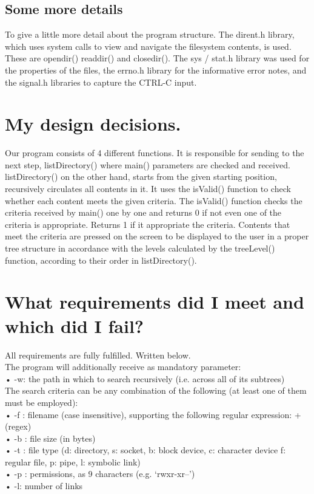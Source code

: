 \documentclass{article}
\begin{document}
\subsection{Some more details}
\quad To give a little more detail about the program structure. The dirent.h library, which uses system calls to view and navigate the filesystem contents, is used. These are opendir() readdir() and closedir(). The sys / stat.h library was used for the properties of the files, the errno.h library for the informative error notes, and the signal.h libraries to capture the CTRL-C input.\\

\section{My design decisions.}
 \quad Our program consists of 4 different functions. It is responsible for sending to the next step, listDirectory() where main() parameters are checked and received. listDirectory() on the other hand, starts from the given starting position, recursively circulates all contents in it. It uses the isValid() function to check whether each content meets the given criteria. The isValid() function checks the criteria received by main() one by one and returns 0 if not even one of the criteria is appropriate. Returns 1 if it appropriate the criteria. Contents that meet the criteria are pressed on the screen to be displayed to the user in a proper tree structure in accordance with the levels calculated by the treeLevel() function, according to their order in listDirectory().\\

\section{What requirements did I meet and which did I fail?}
All requirements are fully fulfilled.  Written below.\\

The program will additionally receive as mandatory parameter:\\
• -w: the path in which to search recursively (i.e. across all of its subtrees)\\


The search criteria can be any combination of the following (at least one of them must be employed):\\
• -f : filename (case insensitive), supporting the following regular expression: + (regex)\\
• -b : file size (in bytes)\\
• -t : file type (d: directory, s: socket, b: block device, c: character device f: regular file, p: pipe, l: symbolic link)\\
• -p : permissions, as 9 characters (e.g. ‘rwxr-xr--’)\\
• -l: number of links\\
\end{document}
